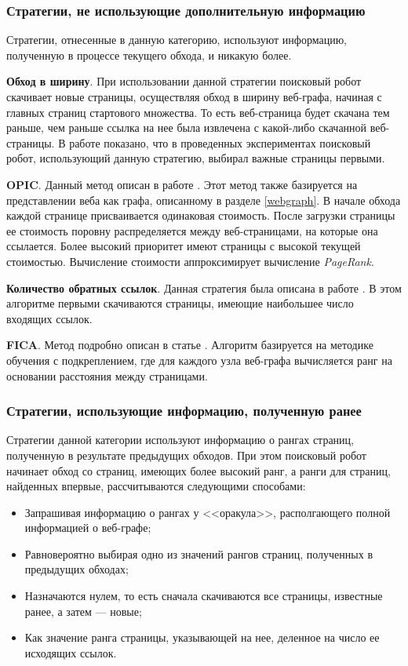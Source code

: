\subsubsection*{Стратегии, не использующие дополнительную информацию}

Стратегии, отнесенные в данную категорию, используют информацию, полученную в процессе текущего обхода, и никакую более.

\textbf{Обход в ширину}. При использовании данной стратегии поисковый робот скачивает новые страницы, осуществляя обход в ширину веб-графа, начиная с главных страниц стартового множества. То есть веб-страница будет скачана тем раньше, чем раньше ссылка на нее была извлечена с какой-либо скачанной веб-страницы. В работе \cite{Najork} показано, что в проведенных экспериментах поисковый робот, использующий данную стратегию, выбирал важные страницы первыми.

\textbf{OPIC}. Данный метод описан в работе \cite{OPIC}. Этот метод также базируется на представлении веба как графа, описанному в разделе \ref{webgraph}. В начале обхода каждой странице присваивается одинаковая стоимость. После загрузки страницы ее стоимость поровну распределяется между веб-страницами, на которые она ссылается. Более высокий приоритет имеют страницы с высокой текущей стоимостью. Вычисление стоимости аппроксимирует вычисление \textit{PageRank}. 

\textbf{Количество обратных ссылок}. Данная стратегия была описана в работе \cite{Cho2}. В этом алгоритме первыми скачиваются страницы, имеющие наибольшее число входящих ссылок.

\textbf{FICA}. Метод подробно описан в статье \cite{FICA}. Алгоритм базируется на методике обучения с подкреплением, где для каждого узла веб-графа вычисляется ранг на основании расстояния между страницами.

\subsubsection*{Стратегии, использующие информацию, полученную ранее}

Стратегии данной категории используют информацию о рангах страниц, полученную в результате предыдущих обходов. При этом поисковый робот начинает обход со страниц, имеющих более высокий ранг, а ранги для страниц, найденных впервые, рассчитываются следующими способами: 

\begin{itemize}
\item Запрашивая информацию о рангах у <<оракула>>, располгающего полной информацией о веб-графе;
\item Равновероятно выбирая одно из значений рангов страниц, полученных в предыдущих обходах;
\item Назначаются нулем, то есть сначала скачиваются все страницы, известные ранее, а затем --- новые;
\item Как значение ранга страницы, указывающей на нее, деленное на число ее исходящих ссылок.
\end{itemize}

